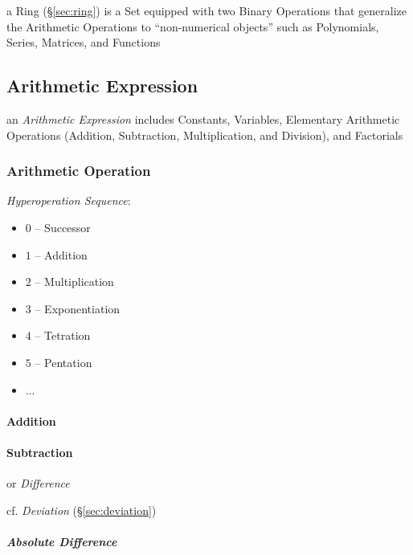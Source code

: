 a Ring (\S\ref{sec:ring}) is a Set equipped with two Binary Operations that
generalize the Arithmetic Operations to ``non-numerical objects'' such as
Polynomials, Series, Matrices, and Functions



\subsection{Arithmetic Expression}\label{sec:arithmetic_expression}

an \emph{Arithmetic Expression} includes Constants, Variables, Elementary
Arithmetic Operations (Addition, Subtraction, Multiplication, and Division), and
Factorials



\subsubsection{Arithmetic Operation}\label{sec:arithmetic_operation}

\emph{Hyperoperation Sequence}:
\begin{itemize}
  \item $0$ -- Successor
  \item $1$ -- Addition
  \item $2$ -- Multiplication
  \item $3$ -- Exponentiation
  \item $4$ -- Tetration
  \item $5$ -- Pentation
  \item ...
\end{itemize}



\paragraph{Addition}\label{sec:addition}\hfill

\paragraph{Subtraction}\label{sec:subtraction}\hfill

or \emph{Difference}

cf. \emph{Deviation} (\S\ref{sec:deviation})



\subparagraph{Absolute Difference}\label{sec:absolute_difference}\hfill

